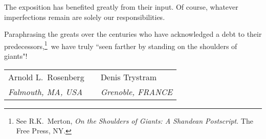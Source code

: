 \noindent
The exposition has benefited greatly from their input.  Of course, whatever imperfections remain are solely our responsibilities.

\smallskip

Paraphrasing the greats over the centuries who have acknowledged a debt to their predecessors,\footnote{See R.K.~Merton,  {\it On the Shoulders of Giants: A Shandean Postscript}.  The Free Press, NY.}~we have truly ``seen farther by standing on the shoulders of giants"!

\bigskip

\hfill \begin{tabular}{lll}
Arnold L.~Rosenberg & \hspace*{.1in} & Denis Trystram \\
{\em Falmouth, MA, USA} & \hspace*{.1in} & {\em Grenoble, FRANCE}
\end{tabular}
